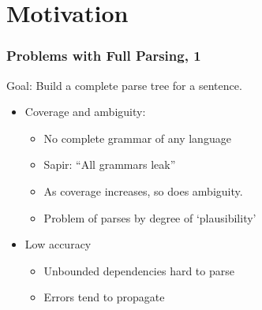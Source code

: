 \frame{\titlepage}


\frame{\tableofcontents}

\section{Motivation}







\begin{frame}[fragile]
  \frametitle{Problems with Full Parsing, 1}

Goal: Build a complete parse tree for a sentence.
  \begin{itemize}
    \item Coverage and ambiguity:
      \begin{itemize}
        \item No complete grammar of any language
        \item Sapir: ``All grammars leak''
        \item As coverage increases, so does ambiguity.
        \item Problem of  parses by degree of `plausibility'
      \end{itemize}
    \item Low accuracy
      \begin{itemize}
        \item Unbounded dependencies hard to parse
        \item Errors tend to propagate
      \end{itemize}
  \end{itemize}

\end{frame}

